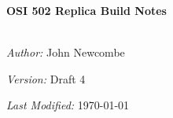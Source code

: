 \begin{titlepage}
\vbox{ }

\vbox{ }

\begin{center}

\\[1cm]

\textsc{\Large }\\[0.5cm]

\vbox{ }

\HRule \\[0.4cm]
{ \huge \bfseries OSI 502 Replica Build Notes}\\[0.0cm]
\HRule \\[0.5cm]

\begin{minipage}{0.4\textwidth}
\begin{flushleft} \large
\emph{Author:} John Newcombe
\end{flushleft}
\end{minipage}
\begin{minipage}{0.4\textwidth}
\begin{flushright} \large
\emph{Version:} Draft 4
\end{flushright}
\end{minipage}
\vfill

\emph{Last Modified:} \large{\today}
\end{center}
\end{titlepage}
